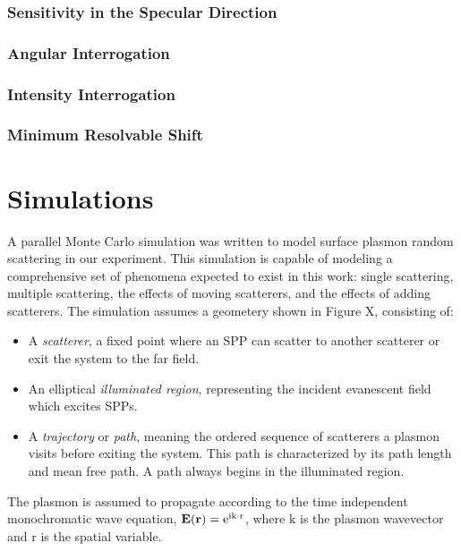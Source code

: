 \documentclass[a4paper,titlepage,onecolumn]{report}
\begin{document}
\subsection{Sensitivity in the Specular Direction}

\subsection{Angular Interrogation}
\subsection{Intensity Interrogation}
\subsection{Minimum Resolvable Shift}



\chapter{Simulations}
A parallel Monte Carlo simulation was written to model surface plasmon
random scattering in our experiment. This simulation is capable of modeling
a comprehensive set of phenomena expected to exist in this work: single
scattering, multiple scattering, the effects of moving scatterers, and the
effects of adding scatterers. The simulation assumes a geometery shown in
Figure X, consisting of:

\begin{itemize}

\item A \textit{scatterer}, a fixed point where an SPP can scatter to
another scatterer or exit the system to the far field.

\item An elliptical \textit{illuminated region}, representing the incident
evanescent field which excites SPPs.

\item A \textit{trajectory} or \textit{path}, meaning the ordered sequence
of scatterers a plasmon visits before exiting the system. This path is
characterized by its path length and mean free path. A path always begins
in the illuminated region.

\end{itemize}

The plasmon is assumed to propagate according to the time independent
monochromatic wave equation, $\mathbf{E}(\mathbf{r})={\mathrm{e}}^{{\mathrm{i}}
\mathrm{k}\cdot \mathrm{r}}$, where $\mathrm{k}$ is the plasmon wavevector
and $\mathrm{r}$ is the spatial variable.
\end{document}
